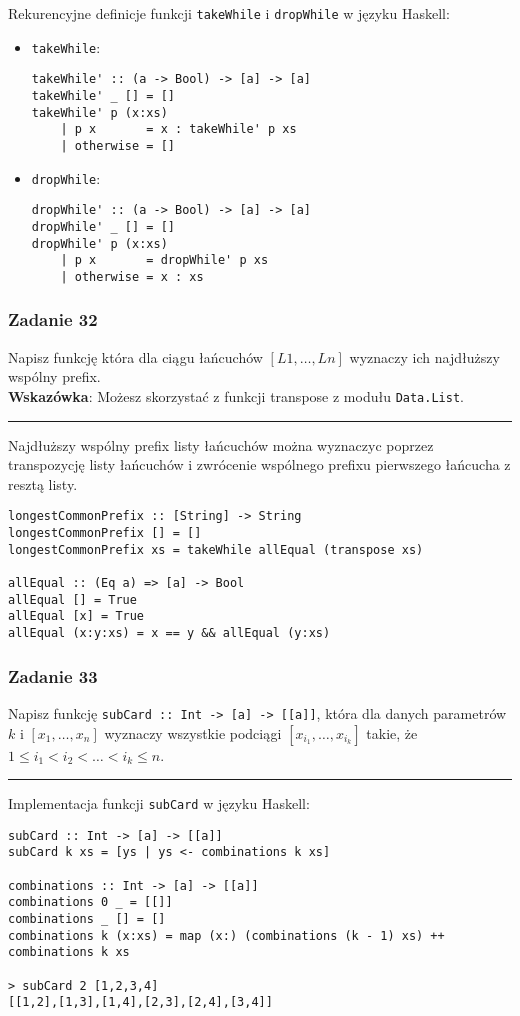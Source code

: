 \documentclass[11pt,a4paper]{article}
\begin{document}
Rekurencyjne definicje funkcji \texttt{takeWhile} i \texttt{dropWhile} w języku Haskell:
\begin{itemize}
    \item \texttt{takeWhile}:
        \begin{Verbatim}[frame=single]
takeWhile' :: (a -> Bool) -> [a] -> [a]
takeWhile' _ [] = []
takeWhile' p (x:xs)
    | p x       = x : takeWhile' p xs
    | otherwise = []
        \end{Verbatim}
    \item \texttt{dropWhile}:
        \begin{Verbatim}[frame=single]
dropWhile' :: (a -> Bool) -> [a] -> [a]
dropWhile' _ [] = []
dropWhile' p (x:xs)
    | p x       = dropWhile' p xs
    | otherwise = x : xs
        \end{Verbatim}
\end{itemize}

\subsubsection{Zadanie 32}
Napisz funkcję która dla ciągu łańcuchów $[L1, \dots, Ln]$ wyznaczy ich najdłuższy wspólny prefix. \\
\textbf{Wskazówka}: Możesz skorzystać z funkcji transpose z modułu \texttt{Data.List}.

\bigskip
\hrule
\bigskip

Najdłuższy wspólny prefix listy łańcuchów można wyznaczyc poprzez transpozycję listy łańcuchów i zwrócenie wspólnego prefixu pierwszego łańcucha z resztą listy.
\begin{Verbatim}[frame=single]
longestCommonPrefix :: [String] -> String
longestCommonPrefix [] = []
longestCommonPrefix xs = takeWhile allEqual (transpose xs)

allEqual :: (Eq a) => [a] -> Bool
allEqual [] = True
allEqual [x] = True
allEqual (x:y:xs) = x == y && allEqual (y:xs)
\end{Verbatim}

\subsubsection{Zadanie 33}
Napisz funkcję \texttt{subCard :: Int -> [a] -> [[a]]}, która dla danych parametrów $k$ i $[x_1, \dots, x_n]$ wyznaczy wszystkie podciągi $[x_{i_1}, \dots, x_{i_k}]$ takie, że $1 \leq i_1 < i_2 < \dots < i_k \leq n$.

\bigskip
\hrule
\bigskip

Implementacja funkcji \texttt{subCard} w języku Haskell:
\begin{Verbatim}[frame=single]
subCard :: Int -> [a] -> [[a]]
subCard k xs = [ys | ys <- combinations k xs]

combinations :: Int -> [a] -> [[a]]
combinations 0 _ = [[]]
combinations _ [] = []
combinations k (x:xs) = map (x:) (combinations (k - 1) xs) ++ combinations k xs

> subCard 2 [1,2,3,4]
[[1,2],[1,3],[1,4],[2,3],[2,4],[3,4]]
\end{Verbatim}
\end{document}
